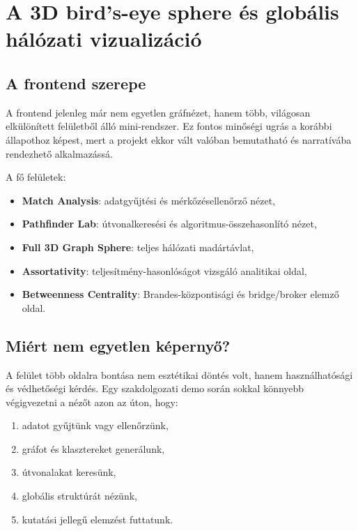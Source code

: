 \chapter{A 3D bird's-eye sphere és globális hálózati vizualizáció}

\section{A frontend szerepe}

A frontend jelenleg már nem egyetlen gráfnézet, hanem több, világosan elkülönített felületből álló mini-rendszer. Ez fontos minőségi ugrás a korábbi állapothoz képest, mert a projekt ekkor vált valóban bemutatható és narratívába rendezhető alkalmazássá.

A fő felületek:

\begin{itemize}
    \item \textbf{Match Analysis}: adatgyűjtési és mérkőzésellenőrző nézet,
    \item \textbf{Pathfinder Lab}: útvonalkeresési és algoritmus-összehasonlító nézet,
    \item \textbf{Full 3D Graph Sphere}: teljes hálózati madártávlat,
    \item \textbf{Assortativity}: teljesítmény-hasonlóságot vizsgáló analitikai oldal,
    \item \textbf{Betweenness Centrality}: Brandes-központisági és bridge/broker elemző oldal.
\end{itemize}

\section{Miért nem egyetlen képernyő?}

A felület több oldalra bontása nem esztétikai döntés volt, hanem használhatósági és védhetőségi kérdés. Egy szakdolgozati demo során sokkal könnyebb végigvezetni a nézőt azon az úton, hogy:

\begin{enumerate}
    \item adatot gyűjtünk vagy ellenőrzünk,
    \item gráfot és klasztereket generálunk,
    \item útvonalakat keresünk,
    \item globális struktúrát nézünk,
    \item kutatási jellegű elemzést futtatunk.
\end{enumerate}

